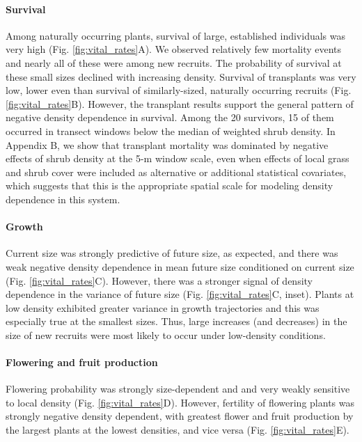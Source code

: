 \documentclass[11pt]{article}\usepackage[]{graphicx}\usepackage[usenames,dvipsnames]{xcolor}
\begin{document}
\paragraph{Survival}
Among naturally occurring plants, survival of large, established individuals was very high (Fig. \ref{fig:vital_rates}A).
We observed relatively few mortality events and nearly all of these were among new recruits. 
The probability of survival at these small sizes declined with increasing density. 
Survival of transplants was very low, lower even than survival of similarly-sized, naturally occurring recruits (Fig. \ref{fig:vital_rates}B). 
However, the transplant results support the general pattern of negative density dependence in survival. 
Among the 20 survivors, 15 of them occurred in transect windows below the median of weighted shrub density. 
In Appendix B, we show that transplant mortality was dominated by negative effects of shrub density at the 5-m window scale, even when effects of local grass and shrub cover were included as alternative or additional statistical covariates, which suggests that this is the appropriate spatial scale for modeling density dependence in this system. 
\paragraph{Growth}
Current size was strongly predictive of future size, as expected, and there was weak negative density dependence in mean future size conditioned on current size (Fig. \ref{fig:vital_rates}C). 
However, there was a stronger signal of density dependence in the variance of future size (Fig. \ref{fig:vital_rates}C, inset).
Plants at low density exhibited greater variance in growth trajectories and this was especially true at the smallest sizes. 
Thus, large increases (and decreases) in the size of new recruits were most likely to occur under low-density conditions. 

\paragraph{Flowering and fruit production}
Flowering probability was strongly size-dependent and and very weakly sensitive to local density (Fig. \ref{fig:vital_rates}D). 
However, fertility of flowering plants was strongly negative density dependent, with greatest flower and fruit production by the largest plants at the lowest densities, and vice versa (Fig. \ref{fig:vital_rates}E).
\end{document}
